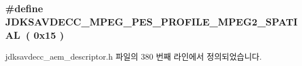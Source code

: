 \subsubsection[{\texorpdfstring{J\+D\+K\+S\+A\+V\+D\+E\+C\+C\+\_\+\+M\+P\+E\+G\+\_\+\+P\+E\+S\+\_\+\+P\+R\+O\+F\+I\+L\+E\+\_\+\+M\+P\+E\+G2\+\_\+\+S\+P\+A\+T\+I\+AL}{JDKSAVDECC_MPEG_PES_PROFILE_MPEG2_SPATIAL}}]{\setlength{\rightskip}{0pt plus 5cm}\#define J\+D\+K\+S\+A\+V\+D\+E\+C\+C\+\_\+\+M\+P\+E\+G\+\_\+\+P\+E\+S\+\_\+\+P\+R\+O\+F\+I\+L\+E\+\_\+\+M\+P\+E\+G2\+\_\+\+S\+P\+A\+T\+I\+AL~( 0x15 )}\hypertarget{group__mpeg__pes__profile_gab21e9ebc6c24990f1ee12e3e62cbde69}{}\label{group__mpeg__pes__profile_gab21e9ebc6c24990f1ee12e3e62cbde69}


jdksavdecc\+\_\+aem\+\_\+descriptor.\+h 파일의 380 번째 라인에서 정의되었습니다.

